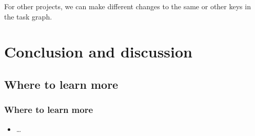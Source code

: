 \documentclass[12pt,aspectratio=169]{beamer}
\begin{document}
\begin{frame}[allowframebreaks]
For other projects, we can make different changes to the same or other keys in the task graph.
\end{frame}

\section{Conclusion and discussion}

\subsection{Where to learn more}

\begin{frame}[allowframebreaks]
\frametitle{Where to learn more}
\begin{itemize}
  \item …
\end{itemize}
\end{frame}
\end{document}
